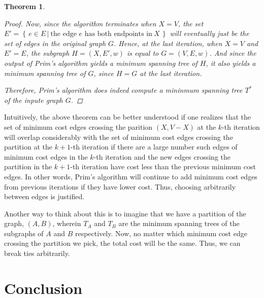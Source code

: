 \documentclass[a4paper,11pt]{report}
\theoremstyle{plain}
\newtheorem{thm}{Theorem}[section]
\theoremstyle{definition}
\begin{document}
\begin{thm}
\begin{proof}
Now, since the algorithm terminates when $X = V$, the set $E' = \left\{\,e\in E
\,|\:\text{the edge $e$ has both endpoints in}\:X\,\right\}$ will eventually
just be the set of edges in the original graph $G$. Hence, at the last
iteration, when $X = V$ and $E' = E$, the subgraph $H = (X, E', w)$ is equal to
$G = (V, E, w)$. And since the output of Prim's algorithm yields a
minimum spanning tree of $H$, it also yields a minimum spanning tree of $G$,
since $H = G$ at the last iteration.

Therefore, Prim's algorithm does indeed compute a mininmum spanning tree
$T^*$ of the inpute graph $G$.
\end{proof}
\end{thm}

Intuitively, the above theorem can be better understood if one realizes that
the set of minimum cost edges crossing the parition $(X, V-X)$ at the
$k$-th iteration will overlap considerably with the set of minimum cost edges
crossing the partition at the $k+1$-th iteration if there are a large number such edges
of minimum cost edges in the $k$-th iteration and the new edges crossing the
partition in the $k+1$-th iteration have cost less than the previous
minimum cost edges. In other words, Prim's algorithm will continue to add
minimum cost edges from previous iterations if they have lower cost. Thus,
choosing arbitrarily between edges is justified.

Another way to think about this is to imagine that we have a partition of
the graph, $(A, B)$, wherein $T_A$ and $T_B$ are the minimum spanning trees
of the subgraphs of $A$ and $B$ respectively. Now, no matter which minimum
cost edge crossing the partition we pick, the total cost will be the same.
Thus, we can break ties arbitrarily.

\section{Conclusion}

%

\nocite{*}
\clearpage



\end{document}
